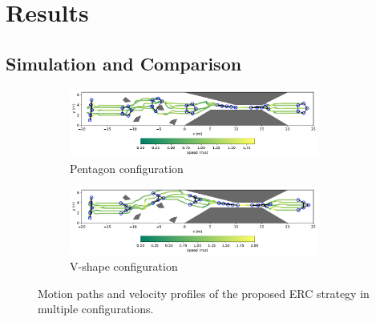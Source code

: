 \section{Results}\label{sec4}
\subsection{Simulation and Comparison}
\begin{figure}[!h]
\begin{subfigure}[b]{\textwidth}
    
    \centering
    \includegraphics[width=0.9\textwidth]{paper2/images/path_edc_shape1.pdf}
    \caption{Pentagon configuration}
    \label{fig:1path_edc1}
\end{subfigure}
\begin{subfigure}[b]{\textwidth}
    \centering
    \includegraphics[width=0.9\textwidth]{paper2/images/path_edc_shape2.pdf}
    \caption{V-shape configuration}
    \label{fig:1path_edc2}
\end{subfigure}
\caption{Motion paths and velocity profiles of the proposed ERC strategy in multiple configurations.}
\label{fig:1path}
\end{figure}

